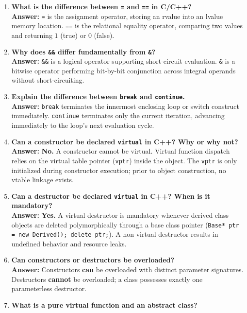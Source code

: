 \begin{enumerate}[leftmargin=*,label=\textbf{Q\arabic*.}]
    \item \textbf{What is the difference between \texttt{=} and \texttt{==} in C/C++?} \\
    \textbf{Answer:} \texttt{=} is the assignment operator, storing an rvalue into an lvalue memory location. \texttt{==} is the relational equality operator, comparing two values and returning $1$ (true) or $0$ (false).
    \item \textbf{Why does \texttt{\&\&} differ fundamentally from \texttt{\&}?} \\
    \textbf{Answer:} \texttt{\&\&} is a logical operator supporting short-circuit evaluation. \texttt{\&} is a bitwise operator performing bit-by-bit conjunction across integral operands without short-circuiting.
    \item \textbf{Explain the difference between \texttt{break} and \texttt{continue}.} \\
    \textbf{Answer:} \texttt{break} terminates the innermost enclosing loop or switch construct immediately. \texttt{continue} terminates only the current iteration, advancing immediately to the loop's next evaluation cycle.
    \item \textbf{Can a constructor be declared \texttt{virtual} in C++? Why or why not?} \\
    \textbf{Answer:} \textbf{No.} A constructor cannot be virtual. Virtual function dispatch relies on the virtual table pointer (\texttt{vptr}) inside the object. The \texttt{vptr} is only initialized during constructor execution; prior to object construction, no vtable linkage exists.
    \item \textbf{Can a destructor be declared \texttt{virtual} in C++? When is it mandatory?} \\
    \textbf{Answer:} \textbf{Yes.} A virtual destructor is mandatory whenever derived class objects are deleted polymorphically through a base class pointer (\texttt{Base* ptr = new Derived(); delete ptr;}). A non-virtual destructor results in undefined behavior and resource leaks.
    \item \textbf{Can constructors or destructors be overloaded?} \\
    \textbf{Answer:} Constructors \textbf{can} be overloaded with distinct parameter signatures. Destructors \textbf{cannot} be overloaded; a class possesses exactly one parameterless destructor.
    \item \textbf{What is a pure virtual function and an abstract class?} \\

\end{enumerate}
